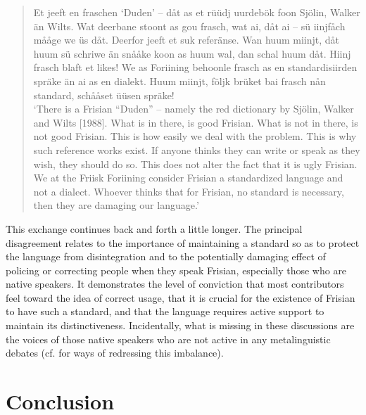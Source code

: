 \documentclass[output=paper]{langsci/langscibook}
\begin{document}
\begin{quote}
Et jeeft en fraschen ‘Duden’ – dåt as et rüüdj uurdebök foon Sjölin, Walker än Wilts. Wat deerbane stoont as gou frasch, wat ai, dåt ai – sü iinjfåch mååge we üs dåt. Deerfor jeeft et suk referänse. Wan huum miinjt, dåt huum sü schriwe än snååke koon as huum wal, dan schal huum dåt. Hiinj frasch blaft et likes! We as Foriining behoonle frasch as en standardisiirden spräke än ai as en dialekt. Huum miinjt, följk brüket bai frasch nån standard, schååset üüsen spräke! \smallskip\\\relax
‘There is a Frisian “Duden” – namely the red dictionary by Sjölin, Walker and Wilts [1988]. What is in there, is good Frisian. What is not in there, is not good Frisian. This is how easily we deal with the problem. This is why such reference works exist. If anyone thinks they can write or speak as they wish, they should do so. This does not alter the fact that it is ugly Frisian. We at the Friisk Foriining consider Frisian a standardized language and not a dialect. Whoever thinks that for Frisian, no standard is necessary, then they are damaging our language.’
\end{quote}

This exchange continues back and forth a little longer. The principal disagreement relates to the importance of maintaining a standard so as to protect the language from disintegration and to the potentially damaging effect of policing or correcting people when they speak Frisian, especially those who are native speakers. It demonstrates the level of conviction that most contributors feel toward the idea of correct usage, that it is crucial for the existence of Frisian to have such a standard, and that the language requires active support to maintain its distinctiveness. Incidentally, what is missing in these discussions are the voices of those native speakers who are not active in any metalinguistic debates (cf. \citealt{AdmiraalEtAl2019} for ways of redressing this imbalance). 

\section{Conclusion}
\label{sec:gregersen:6}
\end{document}
